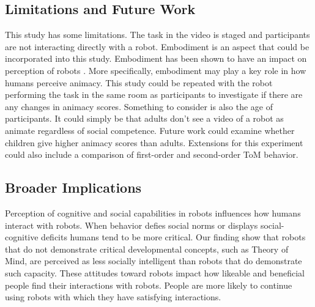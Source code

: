 \documentclass[letterpaper, 10 pt, conference]{ieeeconf}  %
\begin{document}



\subsection{Limitations and Future Work}
This study has some limitations. The task in the video is staged and participants are not interacting directly with a robot. Embodiment is an aspect that could be incorporated into this study. Embodiment has been shown to have an impact on perception of robots \cite{MOLLAHOSSEINI201825}\cite{4813884}. More specifically, embodiment may play a key role in how humans perceive animacy. This study could be repeated with the robot performing the task in the same room as participants to investigate if there are any changes in animacy scores. Something to consider is also the age of participants. It could simply be that adults don't see a video of a robot as animate regardless of social competence. Future work could examine whether children give higher animacy scores than adults. Extensions for this experiment could also include a comparison of first-order and second-order ToM behavior. 

\subsection{Broader Implications}
Perception of cognitive and social capabilities in robots influences how humans interact with robots. When behavior defies social norms or displays social-cognitive deficits humans tend to be more critical.
Our finding show that robots that do not demonstrate critical developmental concepts, such as Theory of Mind, are perceived as less socially intelligent than robots that do demonstrate such capacity.
These attitudes toward robots impact how likeable and beneficial people find their interactions with robots. People are more likely to continue using robots with which they have satisfying interactions. 
\end{document}
